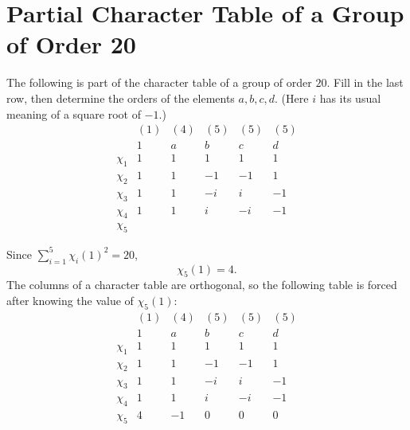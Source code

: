 \documentclass[12pt]{article}
\begin{document}

\section{Partial Character Table of a Group of Order 20}

The following is part of the character table of a group of order $20$.  Fill
in the last row, then determine the orders of the elements $a, b, c, d$.
(Here $i$ has its usual meaning of a square root of $-1$.)
\[
  \begin{array}{c|ccccc}
    & (1) & (4) & (5) & (5) & (5) \\
    & 1   & a   & b   & c   & d   \\
    \hline
    \chi_1 & 1 & 1 &  1 &  1 &  1 \\
    \chi_2 & 1 & 1 & -1 & -1 &  1 \\
    \chi_3 & 1 & 1 & -i &  i & -1 \\
    \chi_4 & 1 & 1 &  i & -i & -1 \\
    \chi_5 &   &   &    &    &
  \end{array}
\]

\noindent\dotfill

Since $\sum_{i = 1}^{5} \chi_{i}(1)^{2} = 20$, 
$$\chi_{5}(1) = 4.$$
The columns of a character table are orthogonal, so the following table is forced after knowing the value of $\chi_{5}(1)$: 
\[
  \begin{array}{c|ccccc}
    & (1) & (4) & (5) & (5) & (5) \\
    & 1   & a   & b   & c   & d   \\
    \hline
    \chi_1 & 1 & 1 &  1 &  1 &  1 \\
    \chi_2 & 1 & 1 & -1 & -1 &  1 \\
    \chi_3 & 1 & 1 & -i &  i & -1 \\
    \chi_4 & 1 & 1 &  i & -i & -1 \\
    \chi_5 & 4 & -1 &  0 & 0 & 0
  \end{array}
\]
\end{document}
